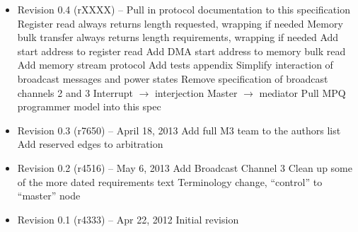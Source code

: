 \documentclass[twoside]{article}
\begin{document}
\begin{itemize}

\item Revision 0.4 {\footnotesize(rXXXX)} --
  \subitem Pull in protocol documentation to this specification
  \subitem Register read always returns length requested, wrapping if needed
  \subitem Memory bulk transfer always returns length requirements, wrapping
  if needed
  \subitem Add start address to register read
  \subitem Add DMA start address to memory bulk read
  \subitem Add memory stream protocol
  \subitem Add tests appendix
  \subitem Simplify interaction of broadcast messages and power states
  \subitem Remove specification of broadcast channels 2 and 3
  \subitem Interrupt $\rightarrow$ interjection
  \subitem Master $\rightarrow$ mediator
  \subitem Pull MPQ programmer model into this spec

\item Revision 0.3 {\footnotesize(r7650)} -- April 18, 2013
\subitem Add full M3 team to the authors list
\subitem Add reserved edges to arbitration

\item Revision 0.2 {\footnotesize(r4516)} -- May 6, 2013
\subitem Add Broadcast Channel 3
\subitem Clean up some of the more dated requirements text
\subitem Terminology change, ``control'' to ``master'' node

\item Revision 0.1 {\footnotesize(r4333)} -- Apr 22, 2012
\subitem Initial revision

\end{itemize}

\clearpage
\appendix




\end{document}
